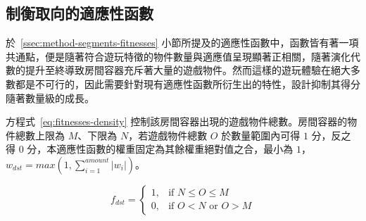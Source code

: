



\subsection{制衡取向的適應性函數}
\label{ssec:method-segments-balancefitness}

於~\ref{ssec:method-segments-fitnesses} 小節所提及的適應性函數中，函數皆有著一項共通點，便是隨著符合遊玩特徵的物件數量與適應值呈現顯著正相關，隨著演化代數的提升至終導致房間容器充斥著大量的遊戲物件。然而這樣的遊玩體驗在絕大多數都是不可行的，因此需要針對現有適應性函數所衍生出的特性，設計抑制其得分隨著數量級的成長。

方程式~\ref{eq:fitnesses-density} 控制該房間容器出現的遊戲物件總數。房間容器的物件總數上限為 $M$、下限為 $N$，若遊戲物件總數 $O$ 於數量範圍內可得 $1$ 分，反之得 $0$ 分，本適應性函數的權重固定為其餘權重絕對值之合，最小為 $1$，$w_{dst} = max(1, \sum_{i=1}^{amount} \lvert w_{i}\rvert)$。

\begin{equation}
    \label{eq:fitnesses-density}
    f_{dst} = \begin{cases}
                  1, & \mbox{if } N \leq O \leq M \\
                  0, & \mbox{if } O<N \text{ or } O>M
              \end{cases}
\end{equation}



